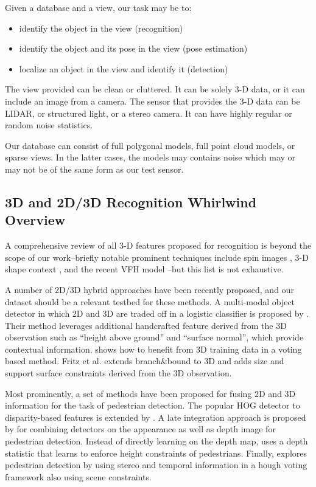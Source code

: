 Given a database and a view, our task may be to:
\begin{itemize}
\item identify the object in the view (recognition)
\item identify the object and its pose in the view (pose estimation)
\item localize an object in the view and identify it (detection)
\end{itemize}

The view provided can be clean or cluttered.
It can be solely 3-D data, or it can include an image from a camera.
The sensor that provides the 3-D data can be LIDAR, or structured light, or a stereo camera.
It can have highly regular or random noise statistics.

Our database can consist of full polygonal models, full point cloud models, or sparse views.
In the latter cases, the models may contains noise which may or may not be of the same form as our test sensor.


\subsection{3D and 2D/3D Recognition Whirlwind Overview}
\label{sec:2d-3d}
A comprehensive review of all 3-D features proposed for recognition is beyond the scope of our work--briefly notable prominent techniques include spin images \cite{spin}, 3-D shape context \cite{Frome3DSC}, and the recent VFH model \cite{RaduVFH}--but this list is not exhaustive. 

A number of 2D/3D hybrid approaches have been recently proposed, and our dataset should be a relevant testbed for these methods. A multi-modal object detector in which 2D and 3D are traded off in a logistic classifier is proposed by \cite{gould08eccv}. Their method leverages additional handcrafted feature derived from the 3D observation such as ``height above ground'' and ``surface normal'', which provide contextual information.
\cite{Sun2010} shows how to benefit from 3D training data in a voting based method.
Fritz et al. \cite{Fritz2010} extends branch\&bound to 3D and adds size and support surface constraints derived from the 3D observation.

Most prominently, a set of methods have been proposed for fusing 2D and 3D information for the task of pedestrian detection.
The popular HOG detector \cite{Dalal2005} to disparity-based features is extended by \cite{hattori}.
A late integration approach is proposed by \cite{rohrbach09dagm} for combining detectors on the appearance as well as depth image for pedestrian detection.
Instead of directly learning on the depth map, \cite{walk10eccv} uses a depth statistic that learns to enforce height constraints of pedestrians.
Finally, \cite{leibe10ijrr} explores pedestrian detection by using stereo and temporal information in a hough voting framework also using scene constraints.

